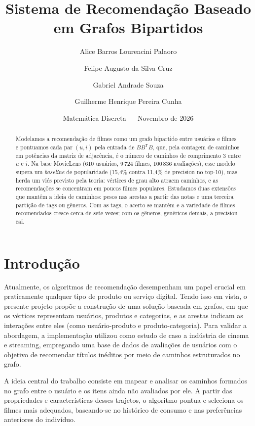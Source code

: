 \documentclass[12pt,a4paper]{article}
\title{Sistema de Recomendação Baseado em Grafos Bipartidos}
\author{Alice Barros Lourencini Palaoro \and Felipe Augusto da Silva Cruz \and
        Gabriel Andrade Souza \and Guilherme Henrique Pereira Cunha}
\date{Matemática Discreta --- Novembro de 2026}
\theoremstyle{definition}
\begin{document}
\maketitle

\begin{abstract}
Modelamos a recomendação de filmes como um grafo bipartido entre usuários
e filmes e pontuamos cada par $(u, i)$ pela entrada de $BB^{\mathsf T}B$,
que, pela contagem de caminhos em potências da matriz de adjacência, é o
número de caminhos de comprimento 3 entre $u$ e $i$. Na base MovieLens
(610 usuários, 9\,724 filmes, 100\,836 avaliações), esse modelo supera
um \emph{baseline} de popularidade (15{,}4\% contra 11{,}4\% de precision
no top-10), mas herda um viés previsto pela teoria: vértices de grau alto
atraem caminhos, e as recomendações se concentram em poucos filmes
populares. Estudamos duas extensões que mantêm a ideia de caminhos:
pesos nas arestas a partir das notas e uma terceira partição de tags ou
gêneros. Com as tags, o acerto se mantém e a variedade de filmes
recomendados cresce cerca de sete vezes; com os gêneros, genéricos
demais, a precision cai.
\end{abstract}

\section{Introdução}\label{sec:intro}


\indent Atualmente, os algoritmos de recomendação desempenham um papel crucial em praticamente qualquer tipo de produto ou serviço digital. Tendo isso em vista, o presente projeto propõe a construção de uma solução baseada em grafos, em que os vértices representam usuários, produtos e categorias, e as arestas indicam as interações entre eles (como usuário-produto e produto-categoria). Para validar a abordagem, a implementação utilizou como estudo de caso a indústria de cinema e streaming, empregando uma base de dados de avaliações de usuários com o objetivo de recomendar títulos inéditos por meio de caminhos estruturados no grafo.

A ideia central do trabalho consiste em mapear e analisar os caminhos formados no grafo entre o usuário e os itens ainda não avaliados por ele. A partir das propriedades e características desses trajetos, o algoritmo pontua e seleciona os filmes mais adequados, baseando-se no histórico de consumo e nas preferências anteriores do indivíduo.
\end{document}
